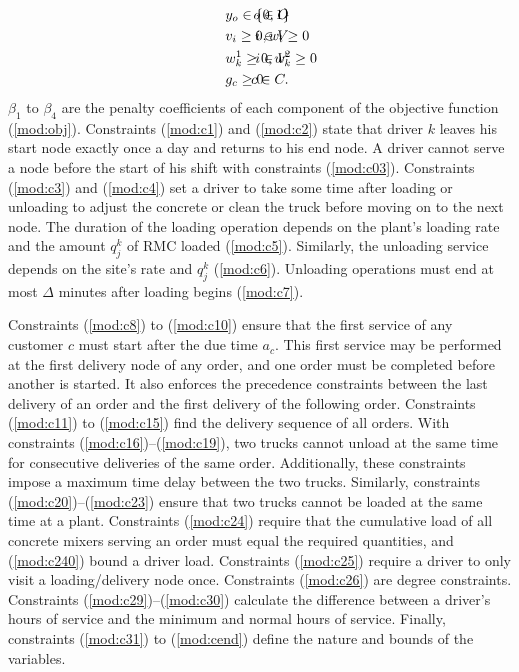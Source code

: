 \documentclass[authoryear,preprint,review,11pt]{elsarticle}
\begin{document}
{\begin{alignat}{3}
    \label{mod:c36}        & y_o \in \{0,1\}     & \hspace{-20mm}  o \in O            \text{ }                     \\
    \label{mod:c37}        & v_i \geq 0,  w_i \geq 0     & \hspace{-20mm}  i \in V         \text{ }                \\
    \label{mod:c38}        & w^1_{k} \geq 0,  w^2_k \geq 0  & \hspace{-20mm}  i \in V         \text{ }        \\
    \label{mod:cend}       & g_c \geq 0    & \hspace{-20mm}  c \in C.  \text{ }
\end{alignat}
}
$\beta_1$ to $\beta_4$ are the penalty coefficients of each component of the objective function (\ref{mod:obj}). Constraints (\ref{mod:c1}) and (\ref{mod:c2}) state that driver $k$ leaves his start node exactly once a day and returns to his end node. A driver cannot serve a node before the start of his shift with constraints (\ref{mod:c03}). Constraints (\ref{mod:c3}) and (\ref{mod:c4}) set a driver to take some time after loading or unloading to adjust the concrete or clean the truck before moving on to the next node. The duration of the loading operation depends on the plant's loading rate and the amount $q^k_j$ of RMC loaded (\ref{mod:c5}). Similarly, the unloading service depends on the site's rate and $q^k_j$ (\ref{mod:c6}). Unloading operations must end at most $\Delta$ minutes after loading begins (\ref{mod:c7}).

Constraints (\ref{mod:c8}) to (\ref{mod:c10}) ensure that the first service of any customer $c$ must start after the due time $a_c$. This first service may be performed at the first delivery node of any order, and one order must be completed before another is started. It also enforces the precedence constraints between the last delivery of an order and the first delivery of the following order. Constraints (\ref{mod:c11}) to (\ref{mod:c15}) find the delivery sequence of all orders. With constraints (\ref{mod:c16})--(\ref{mod:c19}), two trucks cannot unload at the same time for consecutive deliveries of the same order. Additionally, these constraints impose a maximum time delay between the two trucks. Similarly, constraints (\ref{mod:c20})--(\ref{mod:c23}) ensure that two trucks cannot be loaded at the same time at a plant. Constraints (\ref{mod:c24}) require that the cumulative load of all concrete mixers serving an order must equal the required quantities, and (\ref{mod:c240}) bound a driver load. Constraints (\ref{mod:c25}) require a driver to only visit a loading/delivery node once. Constraints (\ref{mod:c26}) are degree constraints. Constraints (\ref{mod:c29})--(\ref{mod:c30}) calculate the difference between a driver's hours of service and the minimum and normal hours of service. Finally, constraints (\ref{mod:c31}) to (\ref{mod:cend}) define the nature and bounds of the variables.
\end{document}
